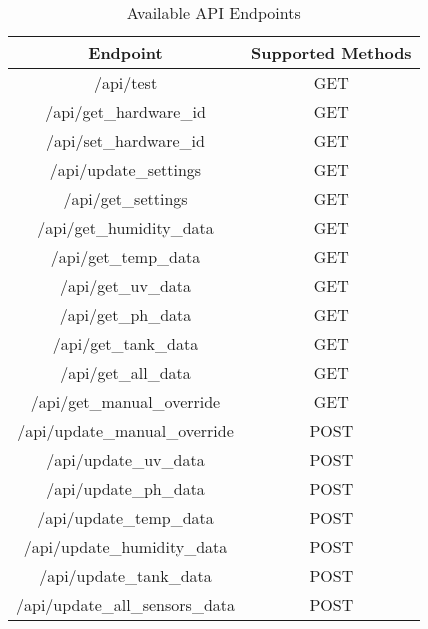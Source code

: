 \documentclass[12pt]{article} %
\begin{document}
\begin{table}[H]
    \centering
    \renewcommand{\arraystretch}{1.25} %
    \begin{tabular}{|c|c|}
        \hline
        \textbf{Endpoint} & \textbf{Supported Methods}\\
        \hline
        /api/test & GET \\
        \hline
        /api/get\_hardware\_id & GET \\
        \hline
        /api/set\_hardware\_id & GET \\
        \hline
        /api/update\_settings & GET \\
        \hline
        /api/get\_settings & GET \\
        \hline
        /api/get\_humidity\_data & GET \\
        \hline
        /api/get\_temp\_data & GET \\
        \hline
        /api/get\_uv\_data & GET \\
        \hline
        /api/get\_ph\_data & GET \\
        \hline
        /api/get\_tank\_data & GET \\
        \hline
        /api/get\_all\_data & GET \\
        \hline
        /api/get\_manual\_override & GET \\
        \hline
        /api/update\_manual\_override & POST \\
        \hline
        /api/update\_uv\_data & POST \\
        \hline
        /api/update\_ph\_data & POST \\
        \hline
        /api/update\_temp\_data & POST \\
        \hline
        /api/update\_humidity\_data & POST \\
        \hline
        /api/update\_tank\_data & POST \\
        \hline
        /api/update\_all\_sensors\_data & POST \\
        \hline
    \end{tabular}
    \caption{Available API Endpoints}
    \label{tab:API_Endpoints}
\end{table}

\pagebreak
\end{document}
